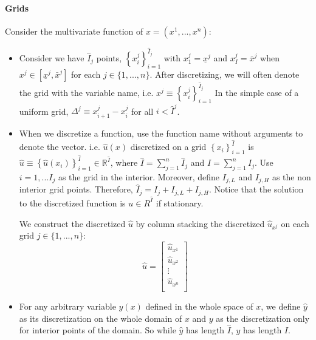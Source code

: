 \documentclass[11pt]{article}
\newcommand{\set}[1]{\ensuremath{\left\{{#1}\right\}}}
\newcommand{\R}{\ensuremath{\mathbb{R}}}
\begin{document}
	\paragraph{Grids}Consider the multivariate function of $x = (x^1,...,x^n )$:
	\begin{itemize}
		\item Consider we have $\hat{I}_j$ points, $\set{x^j_i}_{i=1}^{\hat{I}_j}$%
		 with $x^j_1 = \underline{x}^j$ and $x^j_I = \bar{x}^j$ when $x^j \in [\underline{x}^j, \bar{x}^j]$ for each $j \in \{1,...,n\}$.  After discretizing, we will often denote the grid with the variable name, i.e. $x^j \equiv \set{x^j_i}_{i=1}^{\hat{I}_j}$
		In the simple case of a uniform grid, $\Delta^j \equiv x_{i+1}^j - x_i^j$ for all $i < \hat{I}^j$.
		\item When we discretize a function, use the function name without arguments to denote the vector.  i.e. $\hat{u}(x)$ discretized on a grid $\set{x_i}_{i=1}^{\hat{I}}$  is $\hat{u} \equiv \set{\hat{u}(x_i)}_{i=1}^{\hat{I}} \in \R^{\hat{I}}$, where $\hat{I} = \sum_{j=1}^n \hat{I}_j$ and $I = \sum_{j = 1}^n I_j$.
		Use $i=1,... I_j$ as the grid in the interior. Moreover, define $I_{j,L}$ and $I_{j,H}$ as the non interior grid points. Therefore, $\hat{I}_j = I_j + I_{j,L} + I_{j,H}$. %
		 Notice that the solution to the discretized function is $u \in R^{\hat{I}}$ if stationary.
		
		We construct the discretized $\hat{u}$ by column stacking the discretized $\hat{u}_{x^j}$ on each grid $j \in \{1,...,n\}$:
		\begin{equation}
		\hat{u} = \begin{bmatrix}
		\hat{u}_{x^1}\\
		\hat{u}_{x^2}\\
		\vdots\\
		\hat{u}_{x^n}\\
		\end{bmatrix}\label{u_def}
		\end{equation}
		
		
		
		\item For any arbitrary variable $y(x)$ defined in the whole space of $x$, we define $\hat{y}$ as its discretization on the whole domain of $x$ and $y$ as the discretization only for interior points of the domain. So while $\hat{y}$ has length $\hat{I}$, $y$ has length $I$.
	\end{itemize}
	
\end{document}
